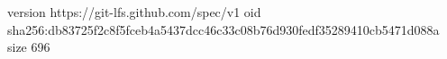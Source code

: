 version https://git-lfs.github.com/spec/v1
oid sha256:db83725f2c8f5fceb4a5437dcc46c33c08b76d930fedf35289410cb5471d088a
size 696
